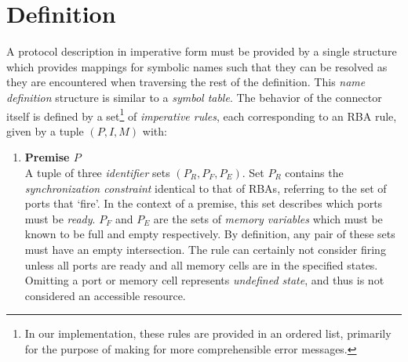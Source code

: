 \section{Definition}
\label{sec:imperative_form_definition}
A protocol description in imperative form must be provided by a single structure which provides mappings for symbolic names such that they can be resolved as they are encountered when traversing the rest of the definition. This \textit{name definition} structure is similar to a \textit{symbol table}. The behavior of the connector itself is defined by a set\footnote{In our implementation, these rules are provided in an ordered list, primarily for the purpose of making for more comprehensible error messages.} of \textit{imperative rules}, each corresponding to an RBA rule, given by a tuple $(P, I, M)$ with:
\begin{enumerate}
	\item \textbf{Premise $P$}\\
	A tuple of three \textit{identifier} sets $(P_R, P_F, P_E)$. Set $P_R$ contains the \textit{synchronization constraint} identical to that of RBAs, referring to the set of ports that `fire'. In the context of a premise, this set describes which ports must be \textit{ready}. $P_F$ and $P_E$ are the sets of \textit{memory variables} which must be known to be full and empty respectively. By definition, any pair of these sets must have an empty intersection. The rule can certainly not consider firing unless all ports are ready and all memory cells are in the specified states. Omitting a port or memory cell represents \textit{undefined state}, and thus is not considered an accessible resource.
	

\end{enumerate}
